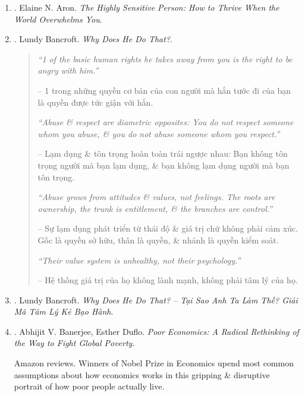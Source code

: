\documentclass{article}
\begin{document}
\begin{enumerate}
	\item \cite{Aron_HSP}. Elaine N. Aron. {\it The Highly Sensitive Person: How to Thrive When the World Overwhelms You}.\hfill{\sf[done]}

	\item \cite{Bancroft_why_he_do}. Lundy Bancroft. {\it Why Does He Do That?}.\hfill{\sf[reading]}
	\begin{quotation}
		{\it``1 of the basic human rights he takes away from you is the right to be angry with him.''}

		-- 1 trong những quyền cơ bản của con người mà hắn tước đi của bạn là quyền được tức giận với hắn.

		{\it``Abuse \& respect are diametric opposites: You do not respect someone whom you abuse, \& you do not abuse someone whom you respect.''}

		-- Lạm dụng \& tôn trọng hoàn toàn trái ngược nhau: Bạn không tôn trọng người mà bạn lạm dụng, \& bạn không lạm dụng người mà bạn tôn trọng.

		{\it``Abuse grows from attitudes \& values, not feelings. The roots are ownership, the trunk is entitlement, \& the branches are control.''}

		-- Sự lạm dụng phát triển từ thái độ \& giá trị chứ không phải cảm xúc. Gốc là quyền sở hữu, thân là quyền, \& nhánh là quyền kiểm soát.

		{\it``Their value system is unhealthy, not their psychology.''}

		-- Hệ thống giá trị của họ không lành mạnh, không phải tâm lý của họ.
	\end{quotation}

	\item \cite{Bancroft_why_he_do_VN}. Lundy Bancroft. {\it Why Does He Do That? -- Tại Sao Anh Ta Làm Thế? Giải Mã Tâm Lý Kẻ Bạo Hành}.\hfill{\sf[done]}

	\item \cite{Banerjee_Duflo_poor_economics}. {\sc Abhijit V. Banerjee, Esther Duflo}. {\it Poor Economics: A Radical Rethinking of the Way to Fight Global Poverty}. {}

	{\sf Amazon reviews.} Winners of Nobel Prize in Economics upend most common assumptions about how economics works in this gripping \& disruptive portrait of how poor people actually live.


\end{enumerate}
\end{document}
